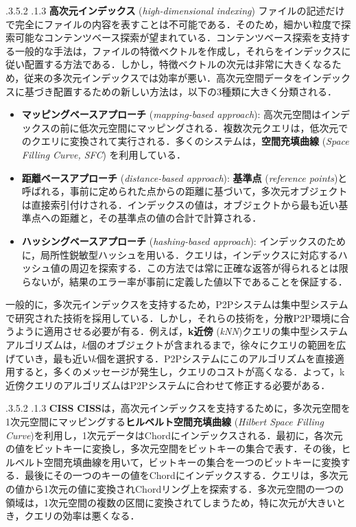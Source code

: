 \documentclass{jarticle}
\makeatletter
\renewcommand{\subsection}{\@startsection{subsection}{2}{\z@}%
   {.3\Cvs \@plus.5\Cvs \@minus.2\Cvs}%
   {.1\Cvs \@plus.3\Cvs}%
   {\reset@font\large\bfseries}}
\renewcommand{\subsubsection}{\@startsection{subsubsection}{3}{\z@}%
   {.3\Cvs \@plus.5\Cvs \@minus.2\Cvs}%
   {.1\Cvs \@plus.3\Cvs}%
   {\reset@font\normalsize\bfseries}}
\makeatother
\begin{document}
{\subsection{\textbf{高次元インデックス} (\textit{high-dimensional indexing})}
ファイルの記述だけで完全にファイルの内容を表すことは不可能である．そのため，細かい粒度で探索可能なコンテンツベース探索が望まれている．コンテンツベース探索を支持する一般的な手法は，ファイルの特徴ベクトルを作成し，それらをインデックスに従い配置する方法である．しかし，特徴ベクトルの次元は非常に大きくなるため，従来の多次元インデックスでは効率が悪い．高次元空間データをインデックスに基づき配置するための新しい方法は，以下の3種類に大きく分類される．
\begin{itemize}
  \item\textbf{マッピングベースアプローチ} (\textit{mapping-based approach}): 高次元空間はインデックスの前に低次元空間にマッピングされる．複数次元クエリは，低次元でのクエリに変換されて実行される．多くのシステムは，\textbf{空間充填曲線} (\textit{Space Filling Curve, SFC}) を利用している．
  \item\textbf{距離ベースアプローチ} (\textit{distance-based approach}): \textbf{基準点} (\textit{reference points})と呼ばれる，事前に定められた点からの距離に基づいて，多次元オブジェクトは直接索引付けされる．インデックスの値は，オブジェクトから最も近い基準点への距離と，その基準点の値の合計で計算される． 
  \item\textbf{ハッシングベースアプローチ} (\textit{hashing-based approach}): インデックスのために，局所性鋭敏型ハッシュを用いる．クエリは，インデックスに対応するハッシュ値の周辺を探索する．この方法では常に正確な返答が得られるとは限らないが，結果のエラー率が事前に定義した値以下であることを保証する．
  \end{itemize}
 
一般的に，多次元インデックスを支持するため，P2Pシステムは集中型システムで研究された技術を採用している．しかし，それらの技術を，分散P2P環境に合うように適用させる必要が有る．例えば，\textbf{k近傍} (\textit{kNN})クエリの集中型システムアルゴリズムは，$k$個のオブジェクトが含まれるまで，徐々にクエリの範囲を広げていき，最も近い$k$個を選択する．P2Pシステムにこのアルゴリズムを直接適用すると，多くのメッセージが発生し，クエリのコストが高くなる．よって，k近傍クエリのアルゴリズムはP2Pシステムに合わせて修正する必要がある．

\subsubsection{\textbf{CISS}}
\textbf{CISS}は，高次元インデックスを支持するために，多次元空間を1次元空間にマッピングする\textbf{ヒルベルト空間充填曲線} (\textit{Hilbert Space Filling Curve})を利用し，1次元データはChordにインデックスされる．最初に，各次元の値をビットキーに変換し，多次元空間をビットキーの集合で表す．その後，ヒルベルト空間充填曲線を用いて，ビットキーの集合を一つのビットキーに変換する．最後にその一つのキーの値をChordにインデックスする．クエリは，多次元の値から1次元の値に変換されChordリング上を探索する．多次元空間の一つの領域は，1次元空間の複数の区間に変換されてしまうため，特に次元が大きいとき，クエリの効率は悪くなる．

}
\end{document}
